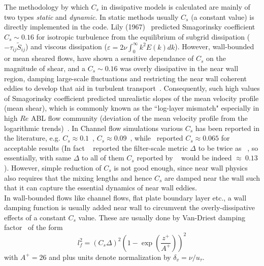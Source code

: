 The methodology by which $C_s$ in dissipative models is calculated are mainly of two types \textit{static} and \textit{dynamic}. In static methods usually $C_s$ (a constant value) is directly implemented in the code. Lily (1967)~\cite{lily0} predicted Smagorinsky coefficient $C_s \sim 0.16$ for isotropic turbulence from the equilibrium of subgrid dissipation ($-\tau_{ij}\widetilde{S}_{ij}$) and viscous dissipation ($\varepsilon = 2\nu \int_{0}^{\infty}k^2E(k)dk$). However, wall-bounded or mean sheared flows, have shown a sensitive dependance of $C_s$ on the magnitude of shear, and a $C_s \sim 0.16$  was overly dissipative in the near wall region, damping large-scale fluctuations and restricting the near wall coherent eddies to develop that aid in turbulent transport~\cite{hor,bers}. Consequently, such high values of Smagorinsky coefficient predicted unrealistic slopes of the mean velocity profile (mean shear), which is commonly known as the ``log-layer mismatch" especially in high $Re$ ABL flow community (deviation of the mean velocity profile from the logarithmic trends)~\cite{andren,meyers2}. In Channel flow simulations various $C_s$ has been reported in the literature, e.g. $C_s \approx 0.1$~\cite{deardoff}, $C_s \approx 0.09$~\cite{bardina2}, while~\cite{moin1} reported $C_s \approx 0.065$ for acceptable results (In fact ~\cite{moin1} reported the filter-scale metric $\Delta$ to be twice as ~\cite{deardoff,bardina}, so essentially, with same $\Delta$ to all of them $C_s$ reported by ~\cite{moin1} would be indeed $\approx \ 0.13$). However, simple reduction of $C_s$ is not good enough, since near wall physics also requires that the mixing lengths and hence $C_s$ are damped near the wall such that it can capture the essential dynamics of near wall eddies.\\
 In wall-bounded flows like channel flows, flat plate boundary layer etc., a wall damping function is usually added near wall to circumvent the overly-dissipative effects of a constant $C_s$ value. These are usually done by Van-Driest damping factor~\cite{van-Driest} of the form
\begin{equation}
l_f^2 = (C_s\Delta)^2\left(1 - \exp(\frac{z^{+}}{A^{+}})\right)^2
\end{equation}
with $A^{+} = 26$ and plus units denote normalization by $\delta_v = \nu/u_{\tau}$.\\
